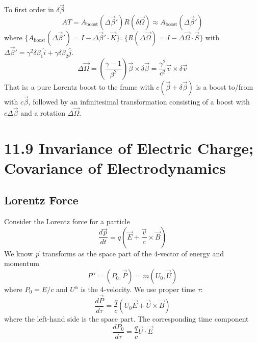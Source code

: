 \documentclass{article}
\begin{document}
	To first order in $\delta\vec{\beta}$
	\[
	AT = A_{\text{boost}}(\Delta\vec{\beta}') R(\delta\vec{\Omega}) \approx A_{\text{boost}}(\Delta\vec{\beta}')
	\]
	where $\{ A_{\text{boost}}(\Delta\vec{\beta}') = I - \Delta\vec{\beta}' \cdot \vec{K} \}$.
	$\{ R(\Delta\vec{\Omega}) = I - \Delta\vec{\Omega} \cdot \vec{S} \}$
	with $\Delta\vec{\beta}' = \gamma^2 \delta\beta_1 \hat{i} + \gamma \delta\beta_2 \hat{j}$.
	\[
	\Delta\vec{\Omega} = (\frac{\gamma-1}{\beta^2}) \vec{\beta} \times \delta\vec{\beta} = \frac{\gamma^2}{c^2} \vec{v} \times \delta\vec{v}
	\]
	That is: a pure Lorentz boost to the frame with $c(\vec{\beta}+\delta\vec{\beta})$ is a boost to/from with $c\vec{\beta}$, followed by an infinitesimal transformation consisting of a boost with $c\Delta\vec{\beta}$ and a rotation $\Delta\vec{\Omega}$.
	
	\newpage
	
	\section*{11.9 Invariance of Electric Charge; Covariance of Electrodynamics}
	
	\subsection*{Lorentz Force}
	Consider the Lorentz force for a particle
	\[
	\frac{d\vec{p}}{dt} = q(\vec{E} + \frac{\vec{v}}{c} \times \vec{B})
	\]
	We know $\vec{p}$ transforms as the space part of the 4-vector of energy and momentum
	\[
	P^\alpha = (P_0, \vec{P}) = m(U_0, \vec{U})
	\]
	where $P_0=E/c$ and $U^\alpha$ is the 4-velocity.
	We use proper time $\tau$:
	\[
	\frac{d\vec{P}}{d\tau} = \frac{q}{c}(U_0\vec{E} + \vec{U} \times \vec{B})
	\]
	where the left-hand side is the space part.
	The corresponding time component
	\[
	\frac{dP_0}{d\tau} = \frac{q}{c} \vec{U} \cdot \vec{E}
	\]
	
\end{document}
